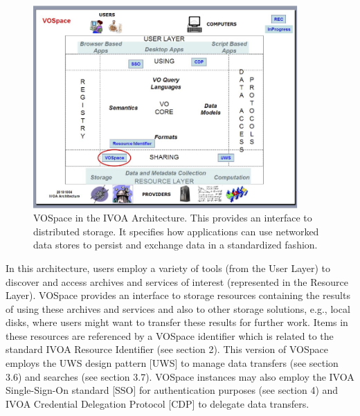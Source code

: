 \documentclass[11pt,a4paper]{ivoa}
\begin{document}
\begin{figure}
\centering


\includegraphics[width=0.9\textwidth]{archdiag.png}
\caption{VOSpace in the IVOA Architecture. This provides an interface to distributed storage. It specifies how applications can use networked data stores to persist and exchange data in a standardized fashion.}
\label{fig:archdiag}
\end{figure}

In this architecture, users employ a variety of tools (from the User Layer) to discover and access archives and services of interest (represented in the Resource Layer). VOSpace provides an interface to storage resources containing the results of using these archives and services and also to other storage solutions, e.g., local disks, where users might want to transfer these results for further work. Items in these resources are referenced by a VOSpace identifier which is related to the standard IVOA Resource Identifier (see section 2). This version of VOSpace employs the UWS design pattern [UWS] to manage data transfers (see section 3.6) and searches (see section 3.7). VOSpace instances may also employ the IVOA Single-Sign-On standard [SSO] for authentication purposes (see section 4) and IVOA Credential Delegation Protocol [CDP] to delegate data transfers.
\end{document}
